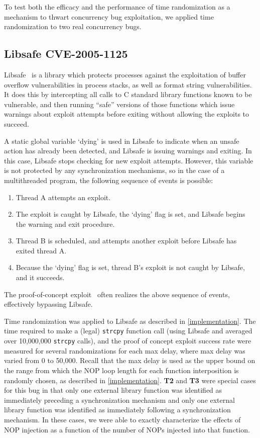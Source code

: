 To test both the efficacy and the performance of time randomization as a mechanism to thwart concurrency bug exploitation, we applied time randomization to two real concurrency bugs.
\subsection{Libsafe CVE-2005-1125}
Libsafe~\cite{Tsai2001} is a library which protects processes against the
exploitation of buffer overflow vulnerabilities in process stacks, as well as
format string vulnerabilities.  It does this by intercepting all calls to C
standard library functions known to be vulnerable, and then running ``safe'' versions of those functions which issue warnings about exploit attempts before exiting without allowing the exploits to succeed.

A static global variable `dying' is used in Libsafe to indicate when an unsafe action has already been detected, and Libsafe is issuing warnings and exiting.  In this case, Libsafe stops checking for new exploit attempts.  However, this variable is not protected by any synchronization mechanisms, so in the case of a multithreaded program, the following sequence of events is possible:
\begin{enumerate}
	\item Thread A attempts an exploit.
	\item The exploit is caught by Libsafe, the `dying' flag is set, and Libsafe begins the warning and exit procedure.
	\item Thread B is scheduled, and attempts another exploit before Libsafe has exited thread A.
	\item Because the `dying' flag is set, thread B's exploit is not caught by Libsafe, and it succeeds.
\end{enumerate}
The proof-of-concept exploit~\cite{Bugtraq13190} often realizes the above sequence of events, effectively bypassing Libsafe.

Time randomization was applied to Libsafe as described in \autoref{implementation}.
The time required to make a (legal) \texttt{strcpy} function call (using Libsafe and averaged over 10,000,000 \texttt{strcpy} calls), and the proof of concept exploit success rate were measured for several randomizations for each max delay, where max delay was varied from 0 to 50,000.
Recall that the max delay is used as the upper bound on the range from which the NOP loop length for each function interposition is randomly chosen, as described in \autoref{implementation}.
\textbf{T2} and \textbf{T3} were special cases for this bug in that only one external library function was identified as immediately preceding a synchronization mechanism and only one external library function was identified as immediately following a synchronization mechanism.
In these cases, we were able to exactly characterize the effects of NOP injection as a function of the number of NOPs injected into that function.
